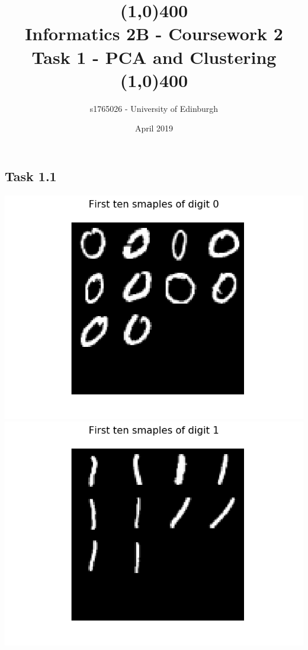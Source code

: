 \documentclass{article}
\title{\line(1,0){400}\\ \textbf{Informatics 2B - Coursework 2} \\ Task 1 - PCA and Clustering\\\line(1,0){400}}
\author{s1765026 - University of Edinburgh}
\date{April 2019}
\begin{document}
\maketitle
\thispagestyle{empty} %

\newpage
{} %


\subsection*{Task 1.1}

\begin{center}
    \includegraphics[trim=3cm 0 0 0, scale=0.4]{images/task1_1_imgs_class0.png}
    \includegraphics[trim=3cm 0 0 0, scale=0.4]{images/task1_1_imgs_class1.png}

\end{center}
\end{document}
